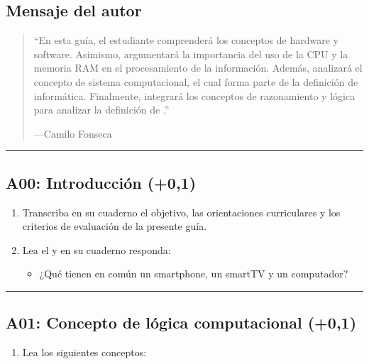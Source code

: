 \documentclass[letterpaper,10pt,spanish]{sphinxmanual}
\begin{document}
\subsection{Mensaje del autor}
\label{\detokenize{1_guias/8logica/G821:mensaje-del-autor}}\begin{quote}

\sphinxAtStartPar
“En esta guía, el estudiante comprenderá los conceptos de hardware y software. Asimismo, argumentará la importancia del uso de la CPU y la memoria RAM en el procesamiento de la información. Además, analizará el concepto de sistema computacional, el cual forma parte de la definición de informática. Finalmente, integrará los conceptos de razonamiento y lógica para analizar la definición de .”

\begin{flushright}
---Camilo Fonseca
\end{flushright}
\end{quote}


\bigskip\hrule\bigskip



\subsection{A00: Introducción (+0,1)}
\label{\detokenize{1_guias/8logica/G821:a00-introduccion-0-1}}
\sphinxAtStartPar
{}
\begin{enumerate}
%
\item {} 
\sphinxAtStartPar
Transcriba en su cuaderno el objetivo, las orientaciones curriculares y los criterios de evaluación de la presente guía.

\item {} 
\sphinxAtStartPar
Lea el  y en su cuaderno responda:
\begin{itemize}
\item {} 
\sphinxAtStartPar
¿Qué tienen en común un smartphone, un smartTV y un computador?

\end{itemize}

\end{enumerate}


\bigskip\hrule\bigskip



\subsection{A01: Concepto de lógica computacional (+0,1)}
\label{\detokenize{1_guias/8logica/G821:a01-concepto-de-logica-computacional-0-1}}
\sphinxAtStartPar
{}
\begin{enumerate}
%
\item {} 
\sphinxAtStartPar
Lea los siguientes conceptos:

\end{enumerate}
\end{document}
